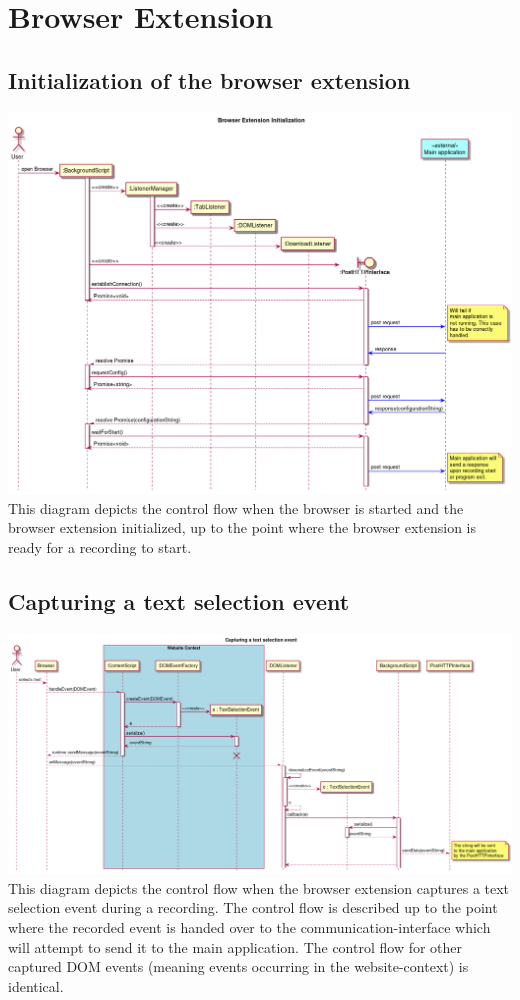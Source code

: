 \section{Browser Extension}
\subsection{Initialization of the browser extension}
\includegraphics[width=1.0\textwidth]{resources/DynamicDiagrams/InitBrowserEx.png}
This diagram depicts the control flow when the browser is started and the browser extension initialized, up to the point where the browser extension is ready for a recording to start.

\subsection{Capturing a text selection event}
\includegraphics[width=1.0\textwidth]{resources/DynamicDiagrams/CaptureEvent.png}
This diagram depicts the control flow when the browser extension captures a text selection event during a recording. The control flow is described up to the point where the recorded event is handed over to the communication-interface which will attempt to send it to the main application. The control flow for other captured DOM events (meaning events occurring in the website-context) is identical.